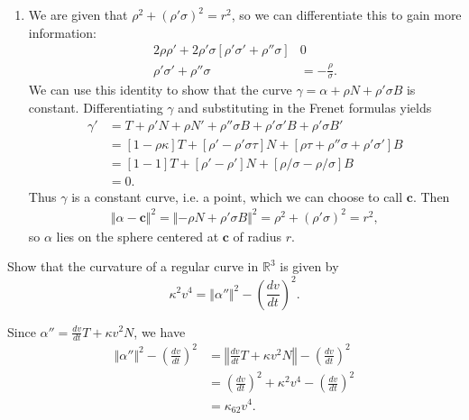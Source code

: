 \documentclass[10pt]{report}
\begin{document}
\begin{enumerate}
	\item We are given that $\rho^2 + (\rho'\sigma)^2 = r^2$, so we can differentiate this to gain more information:
		\begin{align*}
			2\rho \rho' + 2\rho' \sigma[\rho'\sigma' + \rho''\sigma] & 0 \\
			\rho'\sigma' + \rho''\sigma &= -\frac{\rho}{\sigma} .
		\end{align*}
		We can use this identity to show that the curve $\gamma = \alpha + \rho N + \rho' \sigma B$ is constant. Differentiating $\gamma$ and substituting in the Frenet formulas yields
		\begin{align*}
			\gamma' &= T + \rho' N + \rho N' + \rho'' \sigma B + \rho' \sigma' B + \rho' \sigma B' \\
				&= [1 - \rho \kappa] T + [\rho' - \rho' \sigma \tau] N + [\rho\tau + \rho'' \sigma + \rho'\sigma'] B \\
				&= [1-1] T + [\rho' - \rho'] N + [\rho / \sigma - \rho / \sigma] B \\
				&= 0.
		\end{align*}
		Thus $\gamma$ is a constant curve, i.e. a point, which we can choose to call $\mathbf{c}$. Then
		\begin{align*}
			\Vert{\alpha-\mathbf{c}}\Vert^2 = \Vert{-\rho N + \rho'\sigma B}\Vert^2 = \rho^2 + (\rho'\sigma)^2 = r^2,
		\end{align*}
		so $\alpha$ lies on the sphere centered at $\mathbf{c}$ of radius $r$.

\end{enumerate}

\begin{exer}[2.4: 4]
Show that the curvature of a regular curve in $\mathbb{R}^3$ is given by
\[
	\kappa^2 v^4 = \Vert{\alpha''}\Vert^2 - \left(\frac{d v}{d t}\right)^2.
\] 
\end{exer}
Since $\alpha'' = \frac{d v}{d t} T + \kappa v^2 N$, we have
\begin{align*}
	\Vert{\alpha''}\Vert^2 - \left( \frac{d v}{d t}  \right)^2 &= \left\Vert{\frac{d v}{d t} T + \kappa v^2 N}\right\Vert - \left( \frac{d v}{d t}  \right)^2 \\
								   &= \left( \frac{d v}{d t}  \right)^2+\kappa^2 v^4 - \left( \frac{d v}{d t}  \right)^2 \\
								   &= \kappa_{62} v^4.
\end{align*}
\end{document}
